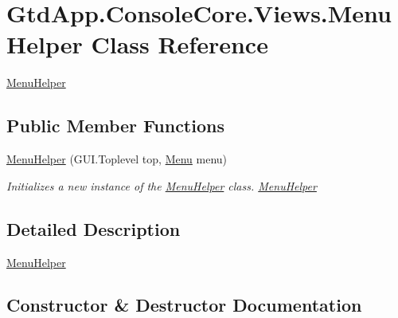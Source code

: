 \hypertarget{class_gtd_app_1_1_console_core_1_1_views_1_1_menu_helper}{}\section{Gtd\+App.\+Console\+Core.\+Views.\+Menu\+Helper Class Reference}
\label{class_gtd_app_1_1_console_core_1_1_views_1_1_menu_helper}


\mbox{\hyperlink{class_gtd_app_1_1_console_core_1_1_views_1_1_menu_helper}{Menu\+Helper}}  


\subsection*{Public Member Functions}
\begin{DoxyCompactItemize}
\item 
\mbox{\hyperlink{class_gtd_app_1_1_console_core_1_1_views_1_1_menu_helper_af5915053e9473efbc2356af86d6adc99}{Menu\+Helper}} (G\+U\+I.\+Toplevel top, \mbox{\hyperlink{class_gtd_app_1_1_console_core_1_1_menu_1_1_menu}{Menu}} menu)
\begin{DoxyCompactList}\small\item\em Initializes a new instance of the \mbox{\hyperlink{class_gtd_app_1_1_console_core_1_1_views_1_1_menu_helper}{Menu\+Helper}} class. \mbox{\hyperlink{class_gtd_app_1_1_console_core_1_1_views_1_1_menu_helper}{Menu\+Helper}} \end{DoxyCompactList}\end{DoxyCompactItemize}


\subsection{Detailed Description}
\mbox{\hyperlink{class_gtd_app_1_1_console_core_1_1_views_1_1_menu_helper}{Menu\+Helper}} 



\subsection{Constructor \& Destructor Documentation}
\mbox{\label{class_gtd_app_1_1_console_core_1_1_views_1_1_menu_helper_af5915053e9473efbc2356af86d6adc99}} 
